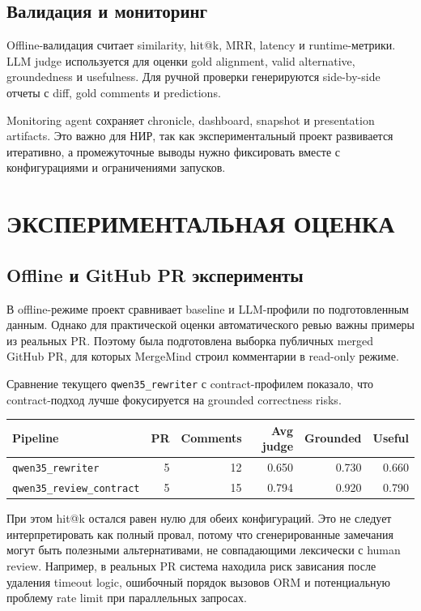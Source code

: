 \documentclass[14pt,a4paper]{extreport}
\begin{document}
\section{Валидация и мониторинг}

Offline-валидация считает similarity, hit@k, MRR, latency и runtime-метрики.
LLM judge используется для оценки gold alignment, valid alternative,
groundedness и usefulness. Для ручной проверки генерируются side-by-side
отчеты с diff, gold comments и predictions.

Monitoring agent сохраняет chronicle, dashboard, snapshot и presentation
artifacts. Это важно для НИР, так как экспериментальный проект развивается
итеративно, а промежуточные выводы нужно фиксировать вместе с конфигурациями и
ограничениями запусков.

\chapter{ЭКСПЕРИМЕНТАЛЬНАЯ ОЦЕНКА}

\section{Offline и GitHub PR эксперименты}

В offline-режиме проект сравнивает baseline и LLM-профили по подготовленным
данным. Однако для практической оценки автоматического ревью важны примеры из
реальных PR. Поэтому была подготовлена выборка публичных merged GitHub PR, для
которых MergeMind строил комментарии в read-only режиме.

Сравнение текущего \texttt{qwen35\_rewriter} с contract-профилем показало, что
contract-подход лучше фокусируется на grounded correctness risks.

\begin{center}
\begin{tabular}{lrrrrr}
  \toprule
  Pipeline & PR & Comments & Avg judge & Grounded & Useful \\
  \midrule
  \texttt{qwen35\_rewriter} & 5 & 12 & 0.650 & 0.730 & 0.660 \\
  \texttt{qwen35\_review\_contract} & 5 & 15 & 0.794 & 0.920 & 0.790 \\
  \bottomrule
\end{tabular}
\end{center}

При этом hit@k остался равен нулю для обеих конфигураций. Это не следует
интерпретировать как полный провал, потому что сгенерированные замечания могут
быть полезными альтернативами, не совпадающими лексически с human review.
Например, в реальных PR система находила риск зависания после удаления timeout
logic, ошибочный порядок вызовов ORM и потенциальную проблему rate limit при
параллельных запросах.
\end{document}
